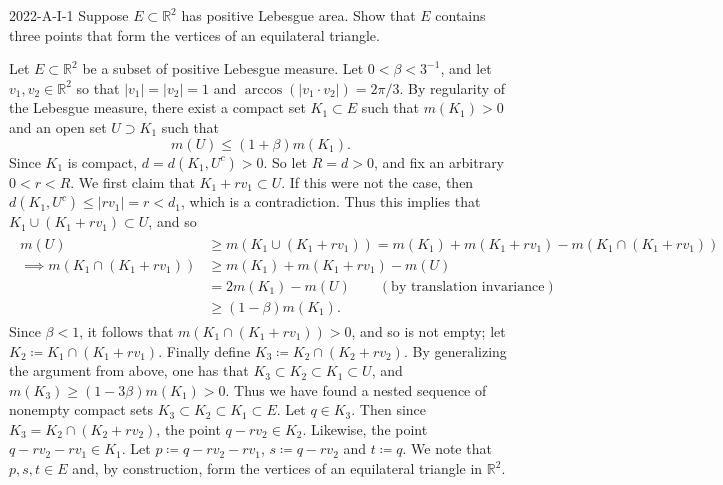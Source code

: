 \documentclass{article}
\begin{document}
		\begin{prb}{2022-A-I-1}
			Suppose $E\subset \mathbb{R}^2$ has positive Lebesgue area. Show that $E$ contains three points that form the vertices of an equilateral triangle. 
		\end{prb}
		Let $E \subset \mathbb{R}^2$ be a subset of positive Lebesgue measure. Let $0 < \beta < 3^{-1}$, and let $v_{1}, v_{2} \in \mathbb{R}^{2}$ so that $|v_{1}| = |v_{2}| = 1$ and $\arccos(|v_{1} \cdot v_{2}|) = 2\pi/3$. By regularity of the Lebesgue measure, there exist a compact set $K_{1} \subset E$ such that $m(K_1) > 0$ and an open set $U \supset K_{1}$ such that 
		\begin{equation*}
			m(U) \leq (1 + \beta)m(K_{1}). 
		\end{equation*}
		Since $K_1$ is compact, $d = d(K_1, U^c) > 0$. So let $R = d> 0$, and fix an arbitrary $0 < r < R$. We first claim that $K_1 + rv_1 \subset U$. If this were not the case, then $d(K_1, U^c) \leq |rv_1| = r < d_1$, which is a contradiction. Thus this implies that $K_1 \cup (K_1 + rv_1) \subset U$, and so 
		\begin{align*}
			\begin{split}
				m(U) &\geq m(K_1 \cup (K_1 + rv_1)) = m(K_1) + m(K_1 + rv_1) - m(K_1 \cap (K_1 + rv_1)) \\
				\implies m(K_1 \cap (K_1 + rv_1)) &\geq m(K_1) + m(K_1 + rv_1) - m(U) \\
				&= 2m(K_1) - m(U) \qquad (\text{by translation invariance}) \\
				&\geq (1 - \beta)m(K_1). 
			\end{split}
		\end{align*}
		Since $\beta < 1$, it follows that $m(K_1 \cap (K_1 + rv_1)) > 0$, and so is not empty; let $K_{2} \coloneqq K_{1} \cap (K_1 + rv_1)$. Finally define $K_{3} \coloneqq K_2 \cap (K_2 + rv_2)$. By generalizing the argument from above, one has that $K_{3} \subset K_{2} \subset K_{1} \subset U$, and $m(K_3) \geq (1 - 3\beta)m(K_1) > 0$. Thus we have found a nested sequence of nonempty compact sets $K_{3} \subset K_{2} \subset K_{1} \subset E$. Let $q \in K_3$. Then since $K_3 = K_2 \cap (K_2 + rv_2)$, the point $q - rv_2 \in K_2$. Likewise, the point $q - rv_2 - rv_1 \in K_1$. Let $p \coloneqq q - rv_2 - rv_1$, $s \coloneqq q - rv_2$ and $t \coloneqq q$. We note that $p,s,t \in E$ and, by construction, form the vertices of an equilateral triangle in $\mathbb{R}^2$. 
		
\end{document}
